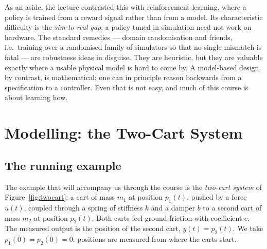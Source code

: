 \documentclass[11pt]{article}
\begin{document}
As an aside, the lecture contrasted this with reinforcement learning, where a
policy is trained from a reward signal rather than from a model. Its
characteristic difficulty is the \emph{sim-to-real gap}: a policy tuned in
simulation need not work on hardware. The standard remedies --- domain
randomisation and friends, i.e.\ training over a randomised family of simulators
so that no single mismatch is fatal --- are robustness ideas in disguise. They are
heuristic, but they are valuable exactly where a usable physical model is hard to
come by. A model-based design, by contrast, is mathematical: one can in principle
reason backwards from a specification to a controller. Even that is not easy, and
much of this course is about learning how.


\section{Modelling: the Two-Cart System}

\subsection{The running example}
The example that will accompany us through the course is the \emph{two-cart
system} of Figure~\ref{fig:twocart}: a cart of mass $m_1$ at position $p_1(t)$,
pushed by a force $u(t)$, coupled through a spring of stiffness $k$ and a damper
$b$ to a second cart of mass $m_2$ at position $p_2(t)$. Both carts feel ground
friction with coefficient $c$. The measured output is the position of the second
cart, $y(t) = p_2(t)$. We take $p_1(0)=p_2(0)=0$: positions are measured from
where the carts start.
\end{document}
